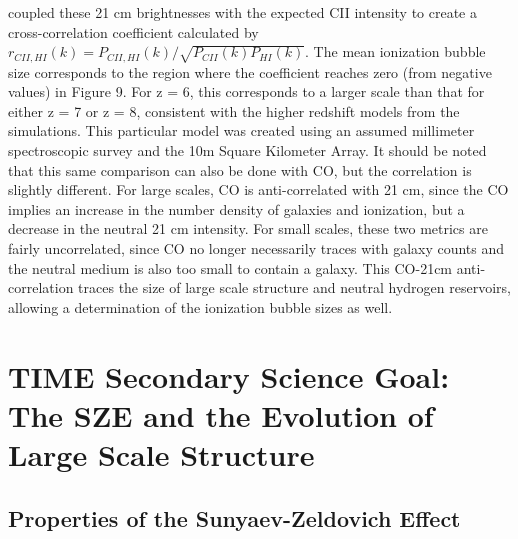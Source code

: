 \documentclass[manuscript]{aastex}
\begin{document}
\cite{Gong2012} coupled these 21 cm brightnesses with the expected CII intensity to create a cross-correlation coefficient calculated by \(r_{CII,HI}(k) = P_{CII,HI}(k)/\sqrt{P_{CII}(k)P_{HI}(k)}\). The mean ionization bubble size corresponds to the region where the coefficient reaches zero (from negative values) in Figure 9. For z = 6, this corresponds to a larger scale than that for either z = 7 or z = 8, consistent with the higher redshift models from the \cite{Santos2010} simulations. This particular model was created using an assumed millimeter spectroscopic survey and the 10m Square Kilometer Array. It should be noted that this same comparison can also be done with CO, but the correlation is slightly different. For large scales, CO is anti-correlated with 21 cm, since the CO implies an increase in the number density of galaxies and ionization, but a decrease in the neutral 21 cm intensity. For small scales, these two metrics are fairly uncorrelated, since CO no longer necessarily traces with galaxy counts and the neutral medium is also too small to contain a galaxy. This CO-21cm anti-correlation traces the size of large scale structure and neutral hydrogen reservoirs, allowing a determination of the ionization bubble sizes as well. 


\section{TIME Secondary Science Goal: The SZE and the Evolution of Large Scale Structure}

\subsection{Properties of the Sunyaev-Zeldovich Effect}
\end{document}
